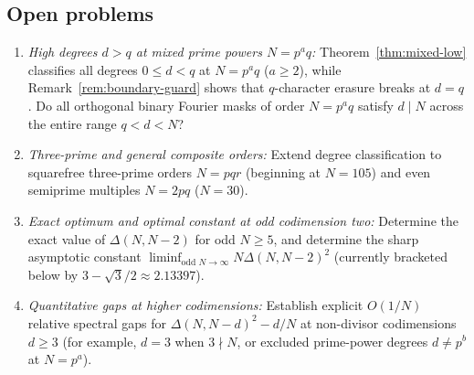 \documentclass[11pt,reqno]{amsart}
\numberwithin{equation}{section}
\theoremstyle{definition}
\theoremstyle{remark}
\begin{document}
\subsection*{Open problems}
\begin{enumerate}[label=(\arabic*),leftmargin=2em]
\item \emph{High degrees $d>q$ at mixed prime powers $N=p^a q$:} Theorem~\ref{thm:mixed-low} classifies all degrees $0\le d<q$ at $N=p^a q$ ($a\ge 2$), while Remark~\ref{rem:boundary-guard} shows that $q$-character erasure breaks at $d=q$. Do all orthogonal binary Fourier masks of order $N=p^a q$ satisfy $d\mid N$ across the entire range $q<d<N$?
\item \emph{Three-prime and general composite orders:} Extend degree classification to squarefree three-prime orders $N=pqr$ (beginning at $N=105$) and even semiprime multiples $N=2pq$ ($N=30$).
\item \emph{Exact optimum and optimal constant at odd codimension two:} Determine the exact value of $\Delta(N,N-2)$ for odd $N\ge 5$, and determine the sharp asymptotic constant $\liminf_{\text{odd }N\to\infty} N\Delta(N,N-2)^2$ (currently bracketed below by $3-\sqrt{3}/2\approx 2.13397$).
\item \emph{Quantitative gaps at higher codimensions:} Establish explicit $O(1/N)$ relative spectral gaps for $\Delta(N,N-d)^2 - d/N$ at non-divisor codimensions $d\ge 3$ (for example, $d=3$ when $3\nmid N$, or excluded prime-power degrees $d\neq p^b$ at $N=p^a$).
\end{enumerate}
\end{document}

